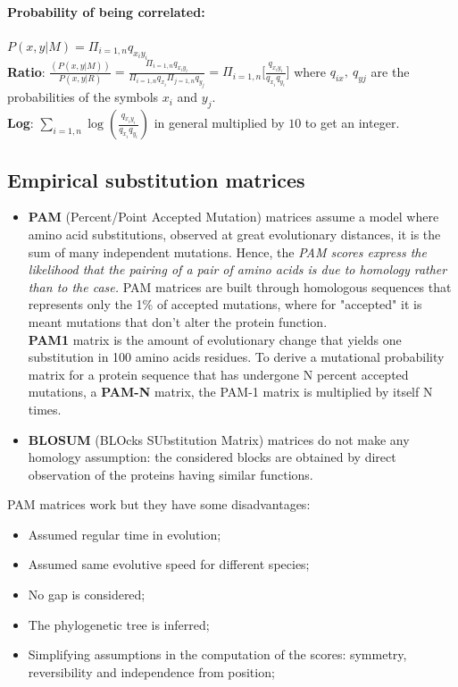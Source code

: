 \paragraph{Probability of being correlated:} $P(x,y|M) = \Pi_{i = 1,n}{q_{x_iy_i}}$  \\

\textbf{Ratio}: $\frac{(P(x,y|M))}{P(x,y|R)} = \frac{\Pi_{i = 1,n}q_{x_iy_i}}{\Pi_{i = 1,n}q_{x_i} \Pi_{j=1,n}q_{y_j}} = \Pi_{i = 1,n}\Big[\frac{q_{x_iy_i}}{q_{x_i}q_{y_i}}\Big]$
where $q_{ix},~q_{yj}$ are the probabilities of the symbols $x_i$ and $y_j$.\\

\textbf{Log}: $\sum_{i = 1,n} \log(\frac{q_{x_iy_i}}{q_{x_i}q_{y_i}})$ in general multiplied by $10$ to get an integer.
\newpage
\subsection{Empirical substitution matrices}
\begin{itemize}
	\item \textbf{PAM} (Percent/Point Accepted Mutation) matrices assume a model where amino acid substitutions, observed at great evolutionary distances, it is the sum of many independent mutations. Hence, the \textit{PAM scores express the likelihood that the pairing of a pair of amino acids is due to homology rather than to the case.} PAM matrices are built through homologous sequences that represents only the 1\% of accepted mutations, where for "accepted" it is meant mutations that don't alter the protein function.\\
	\textbf{PAM1} matrix is the amount of evolutionary change that yields one substitution in 100 amino acids residues. To derive a mutational probability matrix for a protein sequence that has 	undergone N percent accepted mutations, a \textbf{PAM-N} matrix, the	PAM-1 matrix is multiplied by itself N times.

	\item \textbf{BLOSUM} (BLOcks SUbstitution Matrix) matrices do not make any homology assumption: the considered blocks are obtained by direct observation of the proteins having similar functions.
\end{itemize}

PAM matrices work but they have some disadvantages:
\begin{itemize}
	\item Assumed regular time in evolution;
	\item Assumed same evolutive speed for different species;
	\item No gap is considered;
	\item The phylogenetic tree is inferred;
	\item Simplifying assumptions in the computation of the scores: symmetry, reversibility and independence from position;
\end{itemize}

